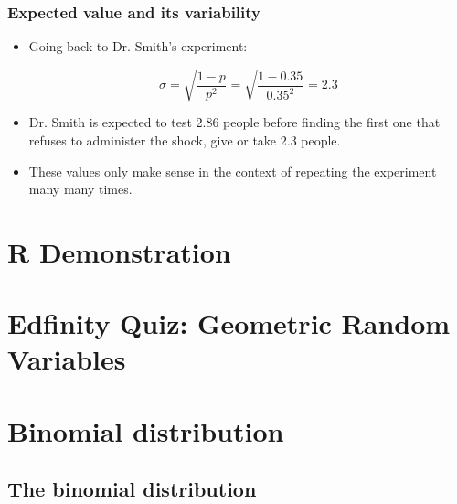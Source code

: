 \documentclass[slidestop,compress,mathserif]{beamer}
\begin{document}

\begin{frame}
\frametitle{Expected value and its variability}


\pause

\begin{itemize}

\item Going back to Dr. Smith's experiment:

\[ \sigma = \sqrt{\frac{1-p}{p^2}} = \sqrt{\frac{1-0.35}{0.35^2}} = 2.3 \]

\pause

\item Dr. Smith is expected to test 2.86 people before finding the first one that refuses to administer the shock, give or take 2.3 people.

\pause

\item These values only make sense in the context of repeating the experiment many many times.

\end{itemize}

\end{frame}


\section{R Demonstration}


\section{Edfinity Quiz: Geometric Random Variables}



\section{Binomial distribution}


\subsection{The binomial distribution}
\end{document}
